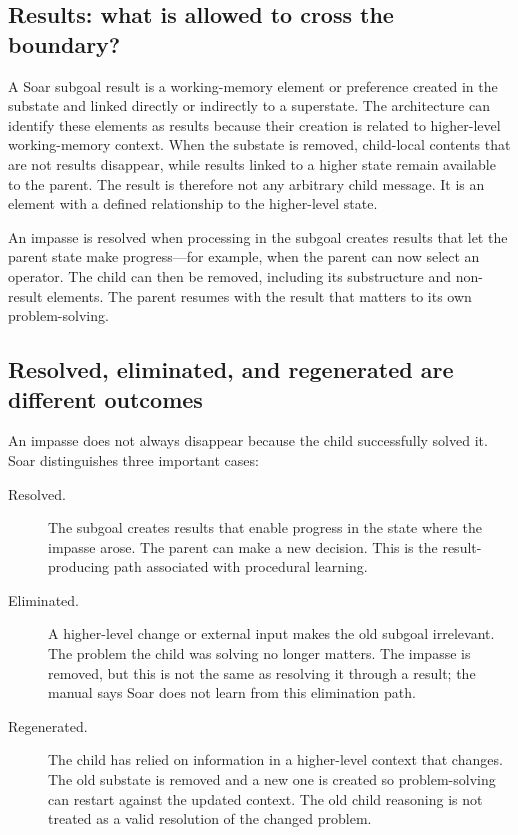 \subsection{Results: what is allowed to cross the boundary?}
\label{subsec:ch13-results}

A Soar subgoal result is a working-memory element or preference created in the substate and linked directly or indirectly to a superstate. The architecture can identify these elements as results because their creation is related to higher-level working-memory context. When the substate is removed, child-local contents that are not results disappear, while results linked to a higher state remain available to the parent. The result is therefore not any arbitrary child message. It is an element with a defined relationship to the higher-level state.\autocite{soar2025architecture}

An impasse is resolved when processing in the subgoal creates results that let the parent state make progress—for example, when the parent can now select an operator. The child can then be removed, including its substructure and non-result elements. The parent resumes with the result that matters to its own problem-solving.\autocite{soar2025architecture}

\subsection{Resolved, eliminated, and regenerated are different outcomes}
\label{subsec:ch13-impasse-lifecycle}

An impasse does not always disappear because the child successfully solved it. Soar distinguishes three important cases:

\begin{description}
  \item[Resolved.] The subgoal creates results that enable progress in the state where the impasse arose. The parent can make a new decision. This is the result-producing path associated with procedural learning.
  \item[Eliminated.] A higher-level change or external input makes the old subgoal irrelevant. The problem the child was solving no longer matters. The impasse is removed, but this is not the same as resolving it through a result; the manual says Soar does not learn from this elimination path.
  \item[Regenerated.] The child has relied on information in a higher-level context that changes. The old substate is removed and a new one is created so problem-solving can restart against the updated context. The old child reasoning is not treated as a valid resolution of the changed problem.
\end{description}

